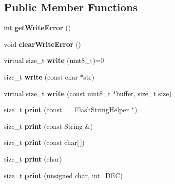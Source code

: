 \subsection*{Public Member Functions}
\begin{DoxyCompactItemize}
\item 
\hypertarget{class_print_a207358e5283fd1720a123ed58ec79196}{int {\bfseries get\-Write\-Error} ()}\label{class_print_a207358e5283fd1720a123ed58ec79196}

\item 
\hypertarget{class_print_af50f0c1e1c726ef3dee08a84456090b9}{void {\bfseries clear\-Write\-Error} ()}\label{class_print_af50f0c1e1c726ef3dee08a84456090b9}

\item 
\hypertarget{class_print_acde4db2f92186810af3493fd2c7535f0}{virtual size\-\_\-t {\bfseries write} (uint8\-\_\-t)=0}\label{class_print_acde4db2f92186810af3493fd2c7535f0}

\item 
\hypertarget{class_print_add50e5436017b9c2f1e0d11c9476bf1b}{size\-\_\-t {\bfseries write} (const char $\ast$str)}\label{class_print_add50e5436017b9c2f1e0d11c9476bf1b}

\item 
\hypertarget{class_print_a7c66fc8d559f4956d4ccea196299bca7}{virtual size\-\_\-t {\bfseries write} (const uint8\-\_\-t $\ast$buffer, size\-\_\-t size)}\label{class_print_a7c66fc8d559f4956d4ccea196299bca7}

\item 
\hypertarget{class_print_a443a13ae44e1a8930db53fc5161554f9}{size\-\_\-t {\bfseries print} (const \-\_\-\-\_\-\-Flash\-String\-Helper $\ast$)}\label{class_print_a443a13ae44e1a8930db53fc5161554f9}

\item 
\hypertarget{class_print_a2e9a01ff871af146cfbf2f321e60853f}{size\-\_\-t {\bfseries print} (const String \&)}\label{class_print_a2e9a01ff871af146cfbf2f321e60853f}

\item 
\hypertarget{class_print_aae81a9f0e10656d079c8ee3d871f95dd}{size\-\_\-t {\bfseries print} (const char\mbox{[}$\,$\mbox{]})}\label{class_print_aae81a9f0e10656d079c8ee3d871f95dd}

\item 
\hypertarget{class_print_abd72fb37c98f21760aa7882cb34bf86b}{size\-\_\-t {\bfseries print} (char)}\label{class_print_abd72fb37c98f21760aa7882cb34bf86b}

\item 
\hypertarget{class_print_a24bf7a9a27ae741994b38fbf45927a38}{size\-\_\-t {\bfseries print} (unsigned char, int=D\-E\-C)}\label{class_print_a24bf7a9a27ae741994b38fbf45927a38}


\end{DoxyCompactItemize}
